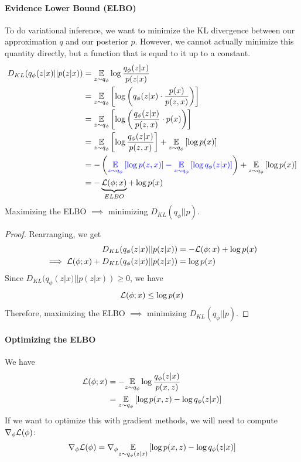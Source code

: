 \documentclass[11pt]{article}
\begin{document}
\paragraph{Evidence Lower Bound (ELBO)}
To do variational inference, we want to minimize the KL divergence between our approximation $q$ and our posterior $p$. However, we cannot actually minimize this quantity directly, but a function that is equal to it up to a constant.
\begin{align*}
	D_{KL}(q_\phi(z|x)||p(z|x)) &= \underset{z \sim q_\phi}{\mathbb{E}} \log \frac{q_\phi(z|x)}{p(z|x)} \\
	&= \underset{z \sim q_\phi}{\mathbb{E}} \left[ \log \left( q_\phi(z|x) \cdot \frac{p(x)}{p(z,x)}\right) \right ] \\
	&= \underset{z \sim q_\phi}{\mathbb{E}} \left[ \log \left( \frac{q_\phi(z|x)}{p(z,x)}\cdot p(x) \right )\right ] \\
	&= \underset{z \sim q_\phi}{\mathbb{E}} \left[ \log \frac{q_\phi (z|x)}{p(z,x)}\right] + \underset{z \sim q_\phi}{\mathbb{E}} \left[\log p(x)\right] \\
	&= -\left(\textcolor{blue}{\underset{z \sim q_\phi}{\mathbb{E}} \left[\log p(z,x)\right]  - \underset{z \sim q_\phi}{\mathbb{E}} \left[ \log q_\phi (z|x)\right] }\right)+ \underset{z \sim q_\phi}{\mathbb{E}} \left[ \log p(x) \right]\\
	&= - \underbrace{\mathcal{L}(\phi;x)}_{ELBO} + \log p(x)
\end{align*}
 Maximizing the ELBO $\implies$ minimizing $D_{KL}(q_\phi || p)$.
\begin{proof}
	Rearranging, we get
	\begin{align*}
		D_{KL}(q_\phi(z|x)||p(z|x)) &= -\mathcal{L}(\phi;x) + \log p(x) \\
		\implies \mathcal{L}(\phi;x) + D_{KL}(q_\phi(z|x)||p(z|x)) &= \log p(x)
	\end{align*}
	Since $D_{KL}(q_\phi(z|x)||p(z|x)) \geq 0$, we have
	$$\mathcal{L}(\phi;x) \leq \log p(x)$$
	Therefore, maximizing the ELBO $\implies$ minimizing $D_{KL}(q_\phi || p)$.
\end{proof} 
\paragraph{Optimizing the ELBO}
We have
\begin{align*}
	\mathcal{L}(\phi;x) &=  -\underset{z \sim q_\phi}{\mathbb{E}} \log \frac{q_\phi(z|x)}{p(x,z)}\\
	&= \underset{z \sim q_\phi}{\mathbb{E}}\left[ \log p(x,z) - \log q_\phi (z|x)\right]
\end{align*}
If we want to optimize this with gradient methods, we will need to compute $\nabla_\phi \mathcal{L}(\phi)$:
$$\nabla_\phi \mathcal{L}(\phi) = \nabla_\phi \underset{z \sim q_\phi(z|x)}{\mathbb{E}}\left[ \log p(x,z) - \log q_\phi (z|x)\right]$$
\end{document}
